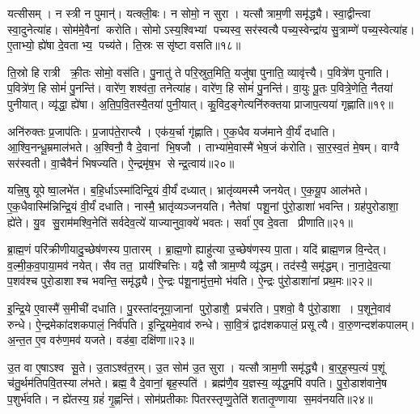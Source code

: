 यत्सीसम्।
न स्त्री न पुमान्॑।
यत्क्ली॒बः।
न सोमो॒ न सुरा।
यत्सौत्राम॒णी समृ॑द्ध्यै।
स्वा॒द्वीन्त्वा स्वा॒दुनेत्या॑ह।
सोम॑मे॒वैनां करोति।
सोमोऽस्य॒श्विभ्यां पच्यस्व॒ सर॑स्वत्यै पच्य॒स्वेन्द्रा॑य सु॒त्राम्णे॑ पच्य॒स्वेत्या॑ह।
ए॒ताभ्यो॒ ह्ये॑षा दे॒वताभ्य॒ पच्य॑ते।
ति॒स्रः ससृ॑ष्टा वसति॥१८॥

ति॒स्रो हि रात्री क्री॒तः सोमो॒ वस॑ति।
पु॒नातु॑ ते परि॒स्रुत॒मिति॒ यजु॑षा पुनाति॒ व्यावृ॑त्त्यै।
प॒वित्रे॑ण पुनाति।
प॒वित्रे॑ण॒ हि सोमं॑ पु॒नन्ति॑।
वारे॑ण॒ शश्व॑ता॒ तनेत्या॑ह।
वारे॑ण॒ हि सोमं॑ पु॒नन्ति॑।
वा॒युः पू॒तः प॒वित्रे॒णेति॒ नैतया॑ पुनीयात्।
व्यृ॑द्धा॒ ह्ये॑षा।
अ॒ति॒प॒वि॒तस्यै॒तया॑ पुनी॒यात्।
कु॒विद॒ङ्गेत्यनि॑रुक्तया प्राजाप॒त्यया॑ गृह्णाति॥१९॥

अनि॑रुक्तः प्र॒जाप॑तिः।
प्र॒जाप॑ते॒राप्त्यै।
एक॑य॒र्चा गृ॑ह्णाति।
ए॒क॒धैव यज॑माने वी॒र्यं॑ दधाति।
आ॒श्वि॒नन्धू॒म्रमाल॑भते।
अ॒श्विनौ॒ वै दे॒वानां भि॒षजौ।
ताभ्या॑मे॒वास्मै॑ भेष॒जं क॑रोति।
सा॒र॒स्व॒तं मे॒षम्।
वाग्वै सर॑स्वती।
वा॒चैवैनं॑ भिषज्यति।
ऐ॒न्द्रमृ॑ष॒भ सेन्द्र॒त्वाय॑॥२०॥\anuvakamend[अक्ष्यो॒र्लोमा॑नि॒ हिर॑ण्यं वसति गृह्णाति भिषज्य॒त्येकं च]

यत्त्रि॒षु यूपेष्वा॒लभे॑त।
ब॒हि॒र्धाऽस्मा॑दिन्द्रि॒यं वी॒र्यं॑ दध्यात्।
भ्रातृ॑व्यमस्मै जनयेत्।
ए॒क॒यू॒प आल॑भते।
ए॒क॒धैवास्मि॑न्निन्द्रि॒यं वी॒र्यं॑ दधाति।
नास्मै॒ भ्रातृ॑व्यञ्जनयति।
नैतेषां पशू॒नां पु॑रो॒डाशा॑ भवन्ति।
ग्रह॑पुरोडाशा॒ ह्ये॑ते।
यु॒व सु॒राम॑मश्वि॒नेति॑ सर्वदेव॒त्ये॑ याज्यानुवा॒क्ये॑ भवतः।
सर्वा॑ ए॒व दे॒वता प्रीणाति॥२१॥

ब्रा॒ह्म॒णं परि॑क्रीणीयादु॒च्छेष॑णस्य पा॒तारम्।
ब्रा॒ह्म॒णो ह्याहु॑त्या उ॒च्छेष॑णस्य पा॒ता।
यदि॑ ब्राह्म॒णन्न वि॒न्देत्।
व॒ल्मी॒क॒व॒पाया॒मव॑ नयेत्।
सैव तत॒ प्राय॑श्चित्तिः।
यद्वै सौत्राम॒ण्यै व्यृ॑द्धम्।
तद॑स्यै॒ समृ॑द्धम्।
ना॒ना॒दे॒व॒त्या प॒शव॑श्च पुरो॒डाशाश्च भवन्ति॒ समृ॑द्ध्यै।
ऐ॒न्द्रः प॑शू॒नामु॑त्त॒मो भ॑वति।
ऐ॒न्द्रः पु॑रो॒डाशा॑नां प्रथ॒मः॥२२॥

इ॒न्द्रि॒ये ए॒वास्मै॑ स॒मीची॑ दधाति।
पु॒रस्ता॑दनूया॒जानां पुरो॒डाशै॒ प्रच॑रति।
प॒शवो॒ वै पु॑रो॒डाशा।
प॒शूने॒वाव॑ रुन्धे।
ऐ॒न्द्रमेका॑दशकपालं॒ निर्व॑पति।
इ॒न्द्रि॒यमे॒वाव॑ रुन्धे।
सा॒वि॒त्रं द्वाद॑शकपालं॒ प्रसूत्यै।
वा॒रु॒णन्दश॑कपालम्।
अ॒न्त॒त ए॒व वरु॑ण॒मव॑ यजते।
वड॑बा॒ दक्षि॑णा॥२३॥

उ॒त वा ए॒षाऽश्व सू॒ते।
उ॒ताऽश्व॑त॒रम्।
उ॒त सोम॑ उ॒त सुरा।
यत्सौत्राम॒णी समृ॑द्ध्यै।
बा॒र्॒ह॒स्प॒त्यं प॒शूं च॑तु॒र्थम॑तिपवि॒तस्या ल॑भते।
ब्रह्म॒ वै दे॒वानां॒ बृह॒स्पति॑।
ब्रह्म॑णै॒व य॒ज्ञस्य॒ व्यृ॑द्ध॒मपि॑ वपति।
पु॒रो॒डाश॑वाने॒ष प॒शुर्भ॑वति।
न ह्ये॑तस्य॒ ग्रहं॑ गृ॒ह्णन्ति॑।
सोम॑प्रतीकाः पितरस्तृप्णु॒तेति॑ शतातृ॒ण्णाया स॒मव॑नयति॥२४॥

